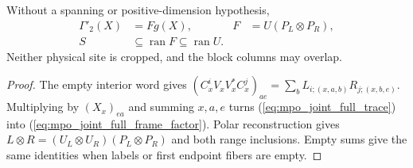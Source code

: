 \begin{lemma}
    \label{thm:mpo_joint_full_frame_support}
    \leanok
    Without a spanning or positive-dimension hypothesis,
    \begin{align}
        \Gamma'_2(X) & =Fg(X),
                     & F                            & =U(P_L\otimes P_R),
        \label{eq:mpo_joint_full_frame_factor}                            \\
        S            & \subseteq\operatorname{ran}F
        \subseteq\operatorname{ran}U.
    \end{align}
    Neither physical site is cropped, and the block columns may overlap.
\end{lemma}
\begin{proof}
    \leanok
    The empty interior word gives
    $(C_x^iV_xV_x^*C_x^j)_{ae}=\sum_bL_{i;(x,a,b)}R_{j;(x,b,e)}$.
    Multiplying by $(X_x)_{ea}$ and summing $x,a,e$ turns
    (\ref{eq:mpo_joint_full_trace}) into
    (\ref{eq:mpo_joint_full_frame_factor}). Polar reconstruction gives
    $L\otimes R=(U_L\otimes U_R)(P_L\otimes P_R)$ and both range
    inclusions. Empty sums give the same identities when labels or
    first endpoint fibers are empty.
\end{proof}

